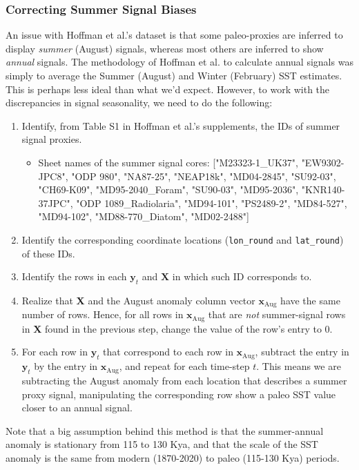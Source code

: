 \documentclass{article}
\begin{document}
\subsubsection{Correcting Summer Signal Biases}
An issue with Hoffman et al.'s dataset is that some paleo-proxies are inferred to display \textit{summer} (August) signals, whereas most others are inferred to show \textit{annual} signals. The methodology of Hoffman et al. to calculate annual signals was simply to average the Summer (August) and Winter (February) SST estimates. This is perhaps less ideal than what we'd expect. However, to work with the discrepancies in signal seasonality, we need to do the following:
\begin{enumerate}
    \item Identify, from Table S1 in Hoffman et al.'s supplements, the IDs of summer signal proxies.
        \begin{itemize}
            \item Sheet names of the summer signal cores: ["M23323-1\_UK37", "EW9302-JPC8", "ODP 980", "NA87-25", "NEAP18k", "MD04-2845", "SU92-03", "CH69-K09", "MD95-2040\_Foram", "SU90-03",  "MD95-2036", "KNR140-37JPC", "ODP 1089\_Radiolaria", "MD94-101", "PS2489-2", "MD84-527", "MD94-102", "MD88-770\_Diatom", "MD02-2488"]
        \end{itemize}

    \item Identify the corresponding coordinate locations (\texttt{lon\_round} and \texttt{lat\_round}) of these IDs.
    \item Identify the rows in each $\textbf{y}_t$ and $\textbf{X}$ in which such ID corresponds to.
    \item Realize that \textbf{X} and the August anomaly column vector $\textbf{x}_{\text{Aug}}$ have the same number of rows. Hence, for all rows in $\textbf{x}_{\text{Aug}}$ that are \textit{not} summer-signal rows in \textbf{X} found in the previous step, change the value of the row's entry to $0$.
    \item For each row in $\textbf{y}_t$ that correspond to each row in $\textbf{x}_{\text{Aug}}$, subtract the entry in $\textbf{y}_t$ by the entry in $\textbf{x}_{\text{Aug}}$, and repeat for each time-step $t$. This means we are subtracting the August anomaly from each location that describes a summer proxy signal, manipulating the corresponding row show a paleo SST value closer to an annual signal.
\end{enumerate}
Note that a big assumption behind this method is that the summer-annual anomaly is stationary from 115 to 130 Kya, and that the scale of the SST anomaly is the same from modern (1870-2020) to paleo (115-130 Kya) periods.
\end{document}
